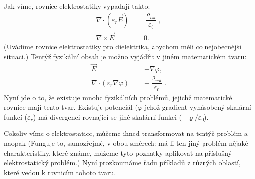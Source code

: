     Jak víme, rovnice elektrostatiky vypadají takto:
    \begin{subequations}
      \begin{align}
         \nabla\cdot(\varepsilon_r\vec{E})&=\dfrac{\varrho_{vol}}{\varepsilon_0},\label{fyz:eq756}\\  
         \nabla\times\vec{E}              &= 0.                                  \label{fyz:eq757}
      \end{align}
    \end{subequations}
    (Uvádíme rovnice elektrostatiky pro dielektrika, abychom měli co nejobecnější situaci.) Tentýž
    fyzikální obsah je možno vyjádřit v jiném matematickém tvaru:
    \begin{subequations}
      \begin{align}
         \vec{E}  &=-\nabla\varphi,                                      \label{fyz:eq758}\\  
         \nabla\cdot(\varepsilon_r\nabla\varphi)
                  &=-\dfrac{\varrho_{vol}}{\varepsilon_0}.               \label{fyz:eq759}
      \end{align}
    \end{subequations}
    Nyní jde o to, že existuje mnoho fyzikálních problémů, jejichž matematické rovnice mají tento
    tvar. Existuje potenciál (\(\varphi\) jehož gradient vynásobený skalární funkcí
    (\(\varepsilon_r\)) má divergenci rovnající se jiné skalární funkci
    (\(-\varrho/\varepsilon_0\)).

    Cokoliv víme o elektrostatice, můžeme ihned transformovat na tentýž problém a naopak (Funguje
    to, samozřejmě, v obou směrech: má-li ten jiný problém nějaké charakteristiky, které známe,
    můžeme tyto poznatky aplikovat na příslušný elektrostatický problém.) Nyní prozkoumáme řadu
    příkladů z různých oblastí, které vedou k rovnicím tohoto tvaru.

    

